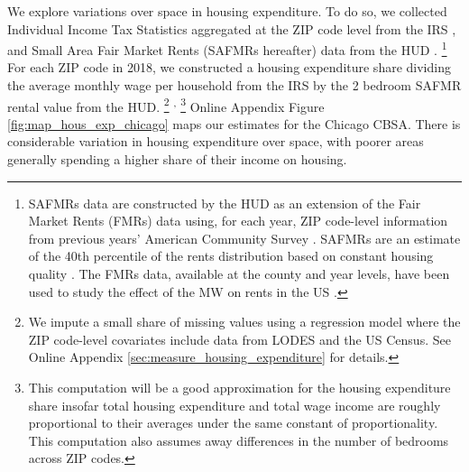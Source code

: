 
We explore variations over space in housing expenditure.
To do so, we collected Individual Income Tax Statistics aggregated at the 
ZIP code level from the IRS \parencite{IRS},
and Small Area Fair Market Rents (SAFMRs hereafter) data from the HUD 
\parencite{hudSAFMR}.%
\footnote{SAFMRs data are constructed by the HUD as an extension of the
    Fair Market Rents (FMRs) data using, for each year, ZIP code-level information
    from previous years' American Community Survey 
    \parencite[][, p.\ 35]{SafmrReport2018}.
    SAFMRs are an estimate of the 40th percentile of the rents distribution
    based on constant housing quality \parencite[][, p.\ 1]{SafmrReport2018}.
    The FMRs data, available at the county and year levels, have been used to study 
    the effect of the MW on rents in the US \parencite{Tidemann2018, Yamagishi2019}.}
For each ZIP code in 2018, we constructed a housing expenditure share dividing 
the average monthly wage per household from the IRS by the 2 bedroom SAFMR 
rental value from the HUD.%
\footnote{We impute a small share of missing values using a regression model 
	where the ZIP code-level covariates include data from LODES and the US 
	Census.
	See Online Appendix \ref{sec:measure_housing_expenditure} for details.}%
\textsuperscript{,}%
\footnote{This computation will be a good approximation for the housing 
	expenditure share insofar total housing expenditure and total wage income 
	are roughly proportional to their averages under the same constant of 
	proportionality.
	This computation also assumes away differences in the number of bedrooms 
	across ZIP codes.}
Online Appendix Figure \ref{fig:map_hous_exp_chicago} maps our estimates for the 
Chicago CBSA.
There is considerable variation in housing expenditure over space, with poorer
areas generally spending a higher share of their income on housing.

